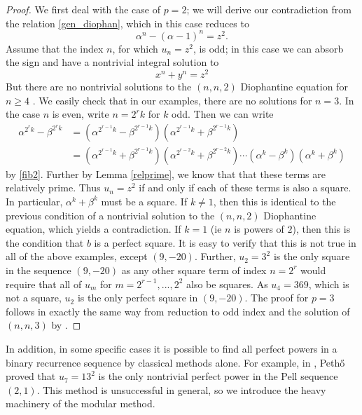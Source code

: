 \documentclass[12pt]{amsart}
\theoremstyle{definition}
\begin{document}
\begin{proof}

We first deal with the case of $p=2$; we will derive our contradiction from the relation \eqref{gen_diophan}, which in this case reduces to
\begin{equation}\label{D1dio} \alpha^n - (\alpha-1)^n = z^2.\end{equation} 
Assume that the index $n$, for which $u_n = z^2$, is odd; in this case we can absorb the sign and have a nontrivial integral solution to
\[ x^n +y^n = z^2 \]
But there are no nontrivial solutions to the $(n,n,2)$ Diophantine equation for $n \geq 4$  \cite{darmon97} .  We easily check that in our examples, there are no solutions for $n=3$.  In the case $n$ is even, write $n=2^rk$ for $k$ odd.  Then we can write
\begin{align*}
\alpha^{2^rk} - \beta^{2^rk} & = (\alpha^{2^{r-1}k} - \beta^{2^{r-1}k})(\alpha^{2^{r-1}k} + \beta^{2^{r-1}k}) \\
& = (\alpha^{2^{r-1}k} + \beta^{2^{r-1}k})(\alpha^{2^{r-2}k} + \beta^{2^{r-2}k}) \cdots (\alpha^{k} - \beta^{k}) (\alpha^{k} + \beta^{k})
\end{align*}
by \eqref{fib2}.  Further by Lemma \ref{relprime}, we know that that these terms are relatively prime.  Thus $u_n=z^2$ if and only if each of these terms is also a square.  In particular, $\alpha^k + \beta^k$ must be a square.  If $k \neq 1$, then this is identical to the previous condition of a nontrivial solution to the $(n,n,2)$ Diophantine equation, which yields a contradiction.  If $k = 1$ (ie $n$ is powers of $2$), then this is the condition that $b$ is a perfect square.  It is easy to verify that this is not true in all of the above examples, except $(9,-20)$.  Further, $u_2 = 3^2$ is the only square in the sequence $(9,-20)$ as any other square term of index $n = 2^r$ would require that all of $u_m$ for $m = 2^{r-1},...,2^2$ also be squares.  As $u_4 = 369$, which is not a square, $u_2$ is the only perfect square in $(9,-20)$.  The proof for $p=3$ follows in exactly the same way from reduction to odd index and the solution of $(n,n,3)$ by \cite{darmon97}.

\end{proof}

In addition, in some specific cases it is possible to find all perfect powers in a binary recurrence sequence by classical methods alone.  For example, in \cite{petho92}, Peth{\H{o}} proved that $u_7 = 13^2$ is the only nontrivial perfect power in the Pell sequence $(2,1)$.  This method is unsuccessful in general, so we introduce the heavy machinery of the modular method.
\end{document}
